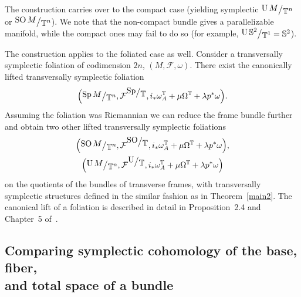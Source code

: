 \documentclass[10pt,a4paper]{amsart}
\numberwithin{equation}{section}
\newcommand{\bigslant}[2]{{\raisebox{.2em}{$#1$}\big/\raisebox{-.2em}{$#2$}}}
\begin{document}
\begin{Remark}\label{main3}
The construction carries over to the compact case (yielding symplectic $\bigslant{\operatorname{U} M}{\mathbb{T}^n}$ or $\bigslant{\operatorname{SO} M}{\mathbb{T}^n}$). We note that the non-compact bundle gives a parallelizable manifold, while the compact ones may fail to do so (for example, $\bigslant{\operatorname{U} \mathbb{S}^2}{\mathbb{T}^1}=\mathbb{S}^2$).
\end{Remark}
\begin{Remark} \label{sedno} The construction applies to the foliated case as well. Consider a transversally symplectic foliation of codimension $2n$, $(M,\mathcal{F},\omega)$. There exist the canonically lifted transversally symplectic foliation
\begin{gather*}
\Big(\bigslant{\operatorname{Sp} M}{\mathbb{T}^n},\mathcal{F}^{\bigslant{{\rm Sp}}{\mathbb{T}}},i_*\omega^{\mathbb{T}}_A + \mu\Omega^{\mathbb{T}} + \lambda p^*\omega\Big).
\end{gather*}
Assuming the foliation was Riemannian we can reduce the frame bundle further and obtain two other lifted transversally symplectic foliations
\begin{gather*}
\Big(\bigslant{\operatorname{SO} M}{\mathbb{T}^n},\mathcal{F}^{\bigslant{{\rm SO}}{\mathbb{T}}},i_*\omega^{\mathbb{T}}_A + \mu\Omega^{\mathbb{T}} + \lambda p^*\omega\Big),\\
\Big(\bigslant{\operatorname{U} M}{\mathbb{T}^n},\mathcal{F}^{\bigslant{{\rm U}}{\mathbb{T}}},i_*\omega^{\mathbb{T}}_A + \mu\Omega^{\mathbb{T}} + \lambda p^*\omega\Big)
\end{gather*}
on the quotients of the bundles of transverse frames, with transversally symplectic structures defined in the similar fashion as in Theorem~\ref{main2}. The canonical lift of a foliation is described in detail in Proposition~2.4 and Chapter~5 of~\cite{molino}.
\end{Remark}

\subsection[Comparing symplectic cohomology of the base, fiber, and total space of a bundle]{Comparing symplectic cohomology of the base, fiber,\\ and total space of a bundle}
\end{document}
